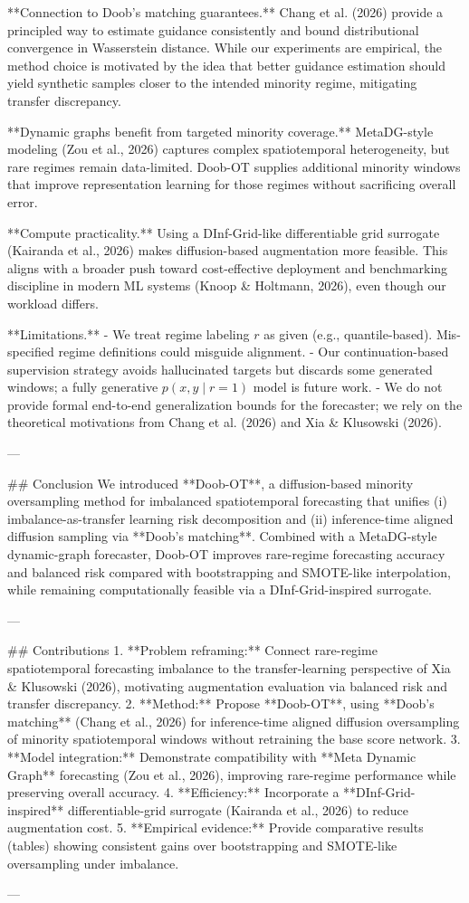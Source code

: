 **Connection to Doob’s matching guarantees.** Chang et al. (2026) provide a principled way to estimate guidance consistently and bound distributional convergence in Wasserstein distance. While our experiments are empirical, the method choice is motivated by the idea that better guidance estimation should yield synthetic samples closer to the intended minority regime, mitigating transfer discrepancy.

**Dynamic graphs benefit from targeted minority coverage.** MetaDG-style modeling (Zou et al., 2026) captures complex spatiotemporal heterogeneity, but rare regimes remain data-limited. Doob-OT supplies additional minority windows that improve representation learning for those regimes without sacrificing overall error.

**Compute practicality.** Using a DInf-Grid-like differentiable grid surrogate (Kairanda et al., 2026) makes diffusion-based augmentation more feasible. This aligns with a broader push toward cost-effective deployment and benchmarking discipline in modern ML systems (Knoop & Holtmann, 2026), even though our workload differs.

**Limitations.**  
- We treat regime labeling \(r\) as given (e.g., quantile-based). Mis-specified regime definitions could misguide alignment.  
- Our continuation-based supervision strategy avoids hallucinated targets but discards some generated windows; a fully generative \(p(x,y\mid r=1)\) model is future work.  
- We do not provide formal end-to-end generalization bounds for the forecaster; we rely on the theoretical motivations from Chang et al. (2026) and Xia & Klusowski (2026).

---

## Conclusion  
We introduced **Doob-OT**, a diffusion-based minority oversampling method for imbalanced spatiotemporal forecasting that unifies (i) imbalance-as-transfer learning risk decomposition and (ii) inference-time aligned diffusion sampling via **Doob’s matching**. Combined with a MetaDG-style dynamic-graph forecaster, Doob-OT improves rare-regime forecasting accuracy and balanced risk compared with bootstrapping and SMOTE-like interpolation, while remaining computationally feasible via a DInf-Grid-inspired surrogate.

---

## Contributions  
1. **Problem reframing:** Connect rare-regime spatiotemporal forecasting imbalance to the transfer-learning perspective of Xia & Klusowski (2026), motivating augmentation evaluation via balanced risk and transfer discrepancy.  
2. **Method:** Propose **Doob-OT**, using **Doob’s matching** (Chang et al., 2026) for inference-time aligned diffusion oversampling of minority spatiotemporal windows without retraining the base score network.  
3. **Model integration:** Demonstrate compatibility with **Meta Dynamic Graph** forecasting (Zou et al., 2026), improving rare-regime performance while preserving overall accuracy.  
4. **Efficiency:** Incorporate a **DInf-Grid-inspired** differentiable-grid surrogate (Kairanda et al., 2026) to reduce augmentation cost.  
5. **Empirical evidence:** Provide comparative results (tables) showing consistent gains over bootstrapping and SMOTE-like oversampling under imbalance.

---